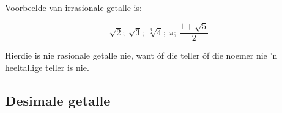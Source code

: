 Voorbeelde van irrasionale getalle is:\par 

\begin{equation*}
\sqrt{2};~\sqrt{3};~\sqrt[3]{4};~\pi ;
~\frac{1+\sqrt{5}}{2}
\end{equation*}

Hierdie is nie rasionale getalle nie, want óf die teller óf die noemer nie 'n heeltallige teller is nie. 


% 


 \subsection*{Desimale getalle}
\nopagebreak

